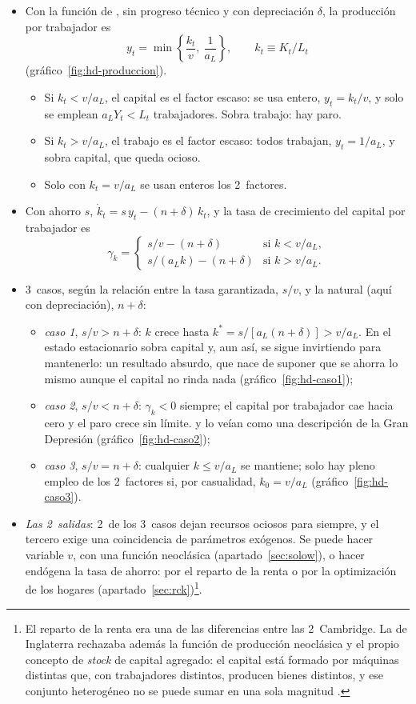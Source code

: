 \documentclass[11pt]{article}
\begin{document}
\begin{itemize}
\item Con la función de , sin progreso técnico y con depreciación $\delta$, la producción por trabajador es
  \[y_t=\min\left\{\frac{k_t}{v},\ \frac{1}{a_L}\right\},\qquad k_t\equiv K_t/L_t\]
  (gráfico~\ref{fig:hd-produccion}).
  \begin{itemize}
  \item Si $k_t<v/a_L$, el capital es el factor escaso: se usa entero, $y_t=k_t/v$, y solo se emplean $a_LY_t<L_t$ trabajadores. Sobra trabajo: hay paro.
  \item Si $k_t>v/a_L$, el trabajo es el factor escaso: todos trabajan, $y_t=1/a_L$, y sobra capital, que queda ocioso.
  \item Solo con $k_t=v/a_L$ se usan enteros los 2~factores.
  \end{itemize}
\item Con ahorro $s$, $\dot k_t=s\,y_t-(n+\delta)\,k_t$, y la tasa de crecimiento del capital por trabajador es
  \[\gamma_k=\begin{cases}s/v-(n+\delta) & \text{si } k<v/a_L,\\ s/(a_Lk)-(n+\delta) & \text{si } k>v/a_L.\end{cases}\]
\item 3~casos, según la relación entre la tasa garantizada, $s/v$, y la natural (aquí con depreciación), $n+\delta$:
  \begin{itemize}
  \item \emph{caso 1}, $s/v>n+\delta$: $k$ crece hasta $k^*=s/[a_L(n+\delta)]>v/a_L$. En el estado estacionario sobra capital y, aun así, se sigue invirtiendo para mantenerlo: un resultado absurdo, que nace de suponer que se ahorra lo mismo aunque el capital no rinda nada (gráfico~\ref{fig:hd-caso1});
  \item \emph{caso 2}, $s/v<n+\delta$: $\gamma_k<0$ siempre; el capital por trabajador cae hacia cero y el paro crece sin límite.  y  lo veían como una descripción de la Gran Depresión (gráfico~\ref{fig:hd-caso2});
  \item \emph{caso 3}, $s/v=n+\delta$: cualquier $k\leq v/a_L$ se mantiene; solo hay pleno empleo de los 2~factores si, por casualidad, $k_0=v/a_L$ (gráfico~\ref{fig:hd-caso3}).
  \end{itemize}
\item \emph{Las 2~salidas}: 2~de los 3~casos dejan recursos ociosos para siempre, y el tercero exige una coincidencia de parámetros exógenos. Se puede hacer variable $v$, con una función neoclásica\nocite{Solow1956} (apartado~\ref{sec:solow}), o hacer endógena la tasa de ahorro: por el reparto de la renta\nocite{Kaldor1957Model,Pasinetti1962Rate} o por la optimización de los hogares (apartado~\ref{sec:rck})\footnote{El reparto de la renta era una de las diferencias entre las 2~Cambridge. La de Inglaterra rechazaba además la función de producción neoclásica y el propio concepto de \emph{stock} de capital agregado: el capital está formado por máquinas distintas que, con trabajadores distintos, producen bienes distintos, y ese conjunto heterogéneo no se puede sumar en una sola magnitud\nocite{Robinson1953Production} .}.
\end{itemize}
\end{document}
